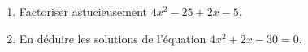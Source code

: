 
\begin{enumerate}
\item Factoriser astucieusement $4x^2-25+2x-5$.
\item En déduire les solutions de l'équation $4x^2+2x-30=0$.
\end{enumerate}